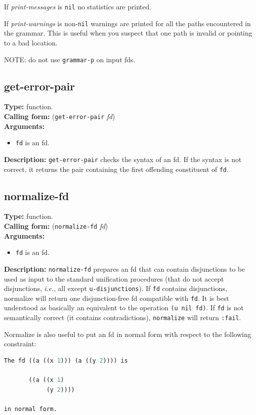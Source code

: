 \documentclass[10pt,a4paper]{report}
\begin{document}
If {\em print-messages} is {\tt nil} no statistics are printed.

If {\em print-warnings} is non-{\tt nil} warnings are printed for
all the paths encountered in the grammar.  This is useful when
you suspect that one path is invalid or pointing to a bad
location.

NOTE: do not use {\tt grammar-p} on input fds.

\subsection{get-error-pair}
{\bf Type:} function.
\\{\bf Calling form:} ({\tt get-error-pair} {\em fd})
\\{\bf Arguments:} 
\begin{itemize}
\item {\tt fd} is an fd.
\end{itemize}
{\bf Description:} {\tt get-error-pair} checks the syntax of an fd.  If the
syntax is not correct, it returns the pair containing the first offending
constituent of {\tt fd}.

\subsection{normalize-fd}
{\bf Type:} function.
\\{\bf Calling form:} ({\tt normalize-fd} {\em fd})
\\{\bf Arguments:} 
\begin{itemize}
\item {\tt fd} is an fd.
\end{itemize}
{\bf Description:} {\tt normalize-fd} prepares an fd that can contain
disjunctions to be used as input to the standard unification procedures
(that do not accept disjunctions, {\em i.e.}, all except {\tt u-disjunctions}). 
If {\tt fd} contains disjunctions, normalize will return one disjunction-free
fd compatible with {\tt fd}.  It is best understood as basically an
equivalent to the operation {\tt (u nil fd)}.  If {\tt fd} is not semantically
correct (it contains contradictions), {\tt normalize} will return {\tt :fail}. 

Normalize is also useful to put an fd in normal form with respect to the
following constraint:
\begin{lstlisting}[language=Lisp]
The fd ((a ((x 1))) (a ((y 2)))) is

       ((a ((x 1)
            (y 2)))) 

in normal form.
\end{lstlisting}
\end{document}
